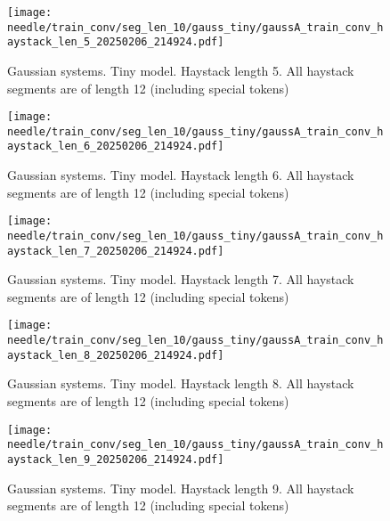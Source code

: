 \begin{figure}[h]
    \centering
    \texttt{[image: needle/train\_conv/seg\_len\_10/gauss\_tiny/gaussA\_train\_conv\_haystack\_len\_5\_20250206\_214924.pdf]}
    \caption{Gaussian systems. Tiny model. Haystack length 5. All haystack segments are of length 12 (including special tokens)}
    \label{fig:gauss_tiny_needle_train_conv_haystack_len_5_all_haystack_len_12}
\end{figure}

\begin{figure}[h]
    \centering
    \texttt{[image: needle/train\_conv/seg\_len\_10/gauss\_tiny/gaussA\_train\_conv\_haystack\_len\_6\_20250206\_214924.pdf]}
    \caption{Gaussian systems. Tiny model. Haystack length 6. All haystack segments are of length 12 (including special tokens)}
    \label{fig:gauss_tiny_needle_train_conv_haystack_len_6_all_haystack_len_12}
\end{figure}

\begin{figure}[h]
    \centering
    \texttt{[image: needle/train\_conv/seg\_len\_10/gauss\_tiny/gaussA\_train\_conv\_haystack\_len\_7\_20250206\_214924.pdf]}
    \caption{Gaussian systems. Tiny model. Haystack length 7. All haystack segments are of length 12 (including special tokens)}
    \label{fig:gauss_tiny_needle_train_conv_haystack_len_7_all_haystack_len_12}

\end{figure}

\begin{figure}[h]
    \centering
    \texttt{[image: needle/train\_conv/seg\_len\_10/gauss\_tiny/gaussA\_train\_conv\_haystack\_len\_8\_20250206\_214924.pdf]}
    \caption{Gaussian systems. Tiny model. Haystack length 8. All haystack segments are of length 12 (including special tokens)}
    \label{fig:gauss_tiny_needle_train_conv_haystack_len_8_all_haystack_len_12}

\end{figure}

\begin{figure}[h]
    \centering
    \texttt{[image: needle/train\_conv/seg\_len\_10/gauss\_tiny/gaussA\_train\_conv\_haystack\_len\_9\_20250206\_214924.pdf]}
    \caption{Gaussian systems. Tiny model. Haystack length 9. All haystack segments are of length 12 (including special tokens)}
    \label{fig:gauss_tiny_needle_train_conv_haystack_len_9_all_haystack_len_12}

\end{figure}

